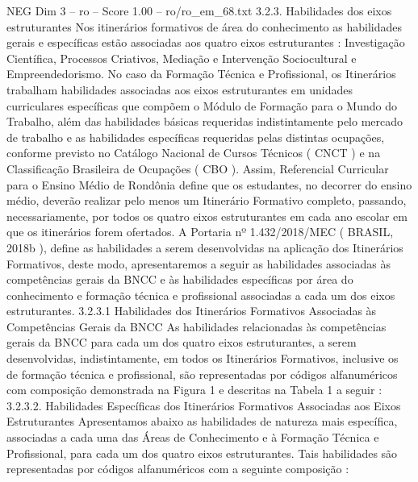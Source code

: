 \begin{textsample}{NEG Dim 3 – ro – Score 1.00 – ro/ro\_em\_68.txt}  \label{ex:f3_neg_160}
3.2.3.
Habilidades dos eixos estruturantes Nos itinerários formativos de área do conhecimento as habilidades gerais e específicas estão associadas aos quatro eixos estruturantes : Investigação Científica, Processos Criativos, Mediação e Intervenção Sociocultural e Empreendedorismo.
No caso da Formação Técnica e Profissional, os Itinerários trabalham habilidades associadas aos eixos estruturantes em unidades curriculares específicas que compõem o Módulo de Formação para o Mundo do Trabalho, além das habilidades básicas requeridas indistintamente pelo mercado de trabalho e as habilidades específicas requeridas pelas distintas ocupações, conforme previsto no Catálogo Nacional de Cursos Técnicos ( CNCT ) e na Classificação Brasileira de Ocupações ( CBO ).
Assim, Referencial Curricular para o Ensino Médio de Rondônia define que os estudantes, no decorrer do ensino médio, deverão realizar pelo menos um Itinerário Formativo completo, passando, necessariamente, por todos os quatro eixos estruturantes em cada ano escolar em que os itinerários forem ofertados.
A Portaria nº 1.432/2018/MEC ( BRASIL, 2018b ), define as habilidades a serem desenvolvidas na aplicação dos Itinerários Formativos, deste modo, apresentaremos a seguir as habilidades associadas às competências gerais da BNCC e às habilidades específicas por área do conhecimento e formação técnica e profissional associadas a cada um dos eixos estruturantes. 3.2.3.1 Habilidades dos Itinerários Formativos Associadas às Competências Gerais da BNCC As habilidades relacionadas às competências gerais da BNCC para cada um dos quatro eixos estruturantes, a serem desenvolvidas, indistintamente, em todos os Itinerários Formativos, inclusive os de formação técnica e profissional, são representadas por códigos alfanuméricos com composição demonstrada na Figura 1 e descritas na Tabela 1 a seguir : 3.2.3.2.
Habilidades Específicas dos Itinerários Formativos Associadas aos Eixos Estruturantes Apresentamos abaixo as habilidades de natureza mais específica, associadas a cada uma das Áreas de Conhecimento e à Formação Técnica e Profissional, para cada um dos quatro eixos estruturantes.
Tais habilidades são representadas por códigos alfanuméricos com a seguinte composição :

\end{textsample}
